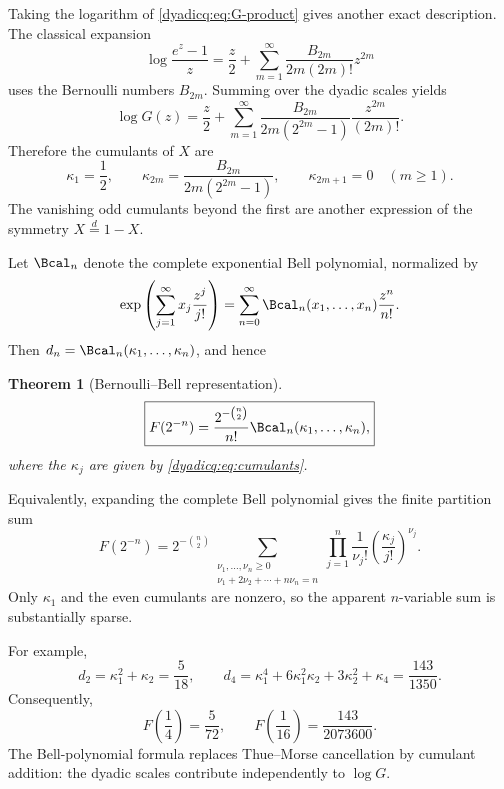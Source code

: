 \documentclass[11pt,oneside]{article}
\newtheorem{theorem}{Theorem}[section]
\theoremstyle{definition}
\theoremstyle{remark}
\begin{document}
Taking the logarithm of \eqref{dyadicq:eq:G-product} gives another exact description.
The classical expansion
\begin{equation}\label{dyadicq:eq:log-E}
 \log\frac{e^z-1}{z}
 =\frac z2+\sum_{m=1}^{\infty}
 \frac{B_{2m}}{2m(2m)!}z^{2m}
\end{equation}
uses the Bernoulli numbers $B_{2m}$.  Summing over the dyadic scales yields
\begin{equation}\label{dyadicq:eq:log-G}
 \log G(z)
 =\frac z2+
 \sum_{m=1}^{\infty}
 \frac{B_{2m}}{2m(2^{2m}-1)}
 \frac{z^{2m}}{(2m)!}.
\end{equation}
Therefore the cumulants of $X$ are
\begin{equation}\label{dyadicq:eq:cumulants}
 \kappa_1=\frac12,
 \qquad
 \kappa_{2m}=\frac{B_{2m}}{2m(2^{2m}-1)},
 \qquad
 \kappa_{2m+1}=0\quad(m\ge1).
\end{equation}
The vanishing odd cumulants beyond the first are another expression of the
symmetry $X\overset d=1-X$.

Let $\Bcal_n$ denote the complete exponential Bell polynomial, normalized by
\begin{equation}\label{dyadicq:eq:Bell-definition}
 \exp\left(\sum_{j=1}^{\infty}x_j\frac{z^j}{j!}\right)
 =\sum_{n=0}^{\infty}\Bcal_n(x_1,\ldots,x_n)\frac{z^n}{n!}.
\end{equation}
Then $d_n=\Bcal_n(\kappa_1,\ldots,\kappa_n)$, and hence
\begin{theorem}[Bernoulli--Bell representation]\label{dyadicq:thm:Bell}
\begin{equation}\label{dyadicq:eq:Bell-dyadic}
 \boxed{
 F(2^{-n})
 =\frac{2^{-\binom n2}}{n!}
 \Bcal_n(\kappa_1,\ldots,\kappa_n),}
\end{equation}
where the $\kappa_j$ are given by \eqref{dyadicq:eq:cumulants}.
\end{theorem}
Equivalently, expanding the complete Bell polynomial gives the finite partition
sum
\begin{equation}\label{dyadicq:eq:cumulant-partition}
 F(2^{-n})
 =2^{-\binom n2}
 \sum_{\substack{\nu_1,\ldots,\nu_n\ge0\\
                    \nu_1+2\nu_2+\cdots+n\nu_n=n}}
 \prod_{j=1}^{n}
 \frac1{\nu_j!}
 \left(\frac{\kappa_j}{j!}\right)^{\nu_j}.
\end{equation}
Only $\kappa_1$ and the even cumulants are nonzero, so the apparent
$n$-variable sum is substantially sparse.

For example,
\[
 d_2=\kappa_1^2+\kappa_2=\frac5{18},
 \qquad
 d_4=\kappa_1^4+6\kappa_1^2\kappa_2+3\kappa_2^2+\kappa_4
 =\frac{143}{1350}.
\]
Consequently,
\[
 F\!\left(\frac14\right)=\frac5{72},
 \qquad
 F\!\left(\frac1{16}\right)=\frac{143}{2073600}.
\]
The Bell-polynomial formula replaces Thue--Morse cancellation by cumulant
addition: the dyadic scales contribute independently to $\log G$.
\end{document}
